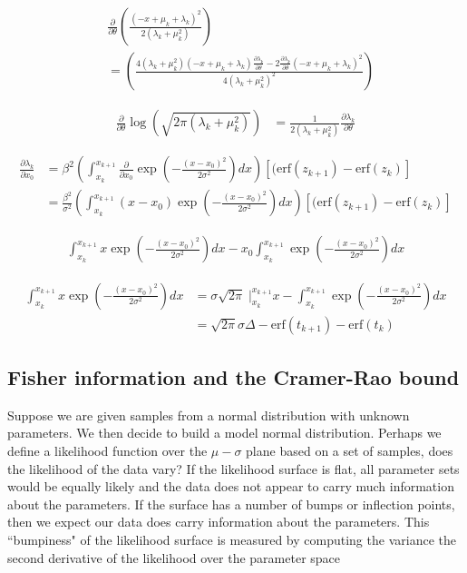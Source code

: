 \documentclass{ucetd}
\begin{document}
\begin{align*}
&\frac{\partial}{\partial \theta} \left(\frac{(-x+\mu_{k}+\lambda_{k})^{2}}{2(\lambda_{k}+\mu_{k}^{2})} \right)\\
&= \left(\frac{4(\lambda_{k}+\mu_{k}^{2})(-x+\mu_{k}+\lambda_{k})\frac{\partial \lambda_{k}}{\partial \theta} - 2\frac{\partial \lambda_{k}}{\partial \theta} (-x+\mu_{k}+\lambda_{k})^{2}}{4(\lambda_{k}+\mu_{k}^{2})^{2}} \right)
\end{align*}

\begin{align*}
\frac{\partial}{\partial \theta} \log\left(\sqrt{2\pi(\lambda_{k} + \mu_{k}^{2})}\right) &= \frac{1}{2(\lambda_{k} + \mu_{k}^{2})}\frac{\partial \lambda_{k}}{\partial \theta}
\end{align*}

\begin{align*}
\frac{\partial \lambda_{k}}{\partial x_{0}} &= \beta^{2}\left(\int_{x_{k}}^{x_{k+1}}\frac{\partial}{\partial x_{0}}\exp\left(-\frac{(x-x_{0})^{2}}{2\sigma^{2}}\right)dx\right)\left[(\mathrm{erf}(z_{k+1}) - \mathrm{erf}(z_{k})\right]\\
&= \frac{\beta^{2}}{\sigma^{2}}\left(\int_{x_{k}}^{x_{k+1}} (x-x_{0})\exp\left(-\frac{(x-x_{0})^{2}}{2\sigma^{2}}\right)dx\right)\left[(\mathrm{erf}(z_{k+1}) - \mathrm{erf}(z_{k})\right]
\end{align*}

\begin{align*}
\int_{x_{k}}^{x_{k+1}} x\exp\left(-\frac{(x-x_{0})^{2}}{2\sigma^{2}}\right)dx - x_{0}\int_{x_{k}}^{x_{k+1}} \exp\left(-\frac{(x-x_{0})^{2}}{2\sigma^{2}}\right)dx
\end{align*}

\begin{align*}
\int_{x_{k}}^{x_{k+1}} x\exp\left(-\frac{(x-x_{0})^{2}}{2\sigma^{2}}\right)dx &= \sigma\sqrt{2\pi}\;\bigg|_{x_{k}}^{x_{k+1}}x  - \int_{x_{k}}^{x_{k+1}} \exp\left(-\frac{(x-x_{0})^{2}}{2\sigma^{2}}\right)dx\\
&= \sqrt{2\pi}\sigma\Delta - \mathrm{erf}(t_{k+1}) - \mathrm{erf}(t_{k})
\end{align*}


\subsection{Fisher information and the Cramer-Rao bound}

Suppose we are given samples from a normal distribution with unknown parameters. We then decide to build a model normal distribution. Perhaps we define a likelihood function over the $\mu-\sigma$ plane based on a set of samples, does the likelihood of the data vary? If the likelihood surface is flat, all parameter sets would be equally likely and the data does not appear to carry much information about the parameters. If the surface has a number of bumps or inflection points, then we expect our data does carry information about the parameters. This ``bumpiness" of the likelihood surface is measured by computing the variance the second derivative of the likelihood over the parameter space\\
\end{document}
